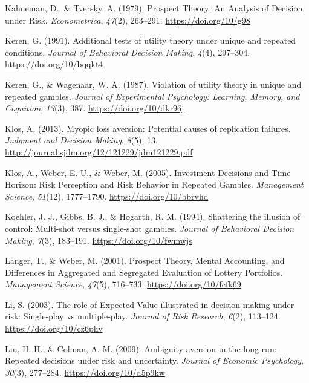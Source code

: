 \documentclass[
  english,
  man, donotrepeattitle,floatsintext]{apa7}
\newlength{\cslhangindent}
\newenvironment{cslreferences}%
  {\setlength{\parindent}{0pt}%
  \everypar{\setlength{\hangindent}{\cslhangindent}}\ignorespaces}%
  {\par}
\theoremstyle{definition}
\theoremstyle{definition}
\theoremstyle{definition}
\theoremstyle{definition}
\theoremstyle{remark}
\begin{document}
\begin{cslreferences}
\leavevmode\hypertarget{ref-kahneman1979}{}%
Kahneman, D., \& Tversky, A. (1979). Prospect Theory: An Analysis of Decision under Risk. \emph{Econometrica}, \emph{47}(2), 263--291. \url{https://doi.org/10/g98}

\leavevmode\hypertarget{ref-keren1991}{}%
Keren, G. (1991). Additional tests of utility theory under unique and repeated conditions. \emph{Journal of Behavioral Decision Making}, \emph{4}(4), 297--304. \url{https://doi.org/10/bqqkt4}

\leavevmode\hypertarget{ref-keren1987}{}%
Keren, G., \& Wagenaar, W. A. (1987). Violation of utility theory in unique and repeated gambles. \emph{Journal of Experimental Psychology: Learning, Memory, and Cognition}, \emph{13}(3), 387. \url{https://doi.org/10/dkr96j}

\leavevmode\hypertarget{ref-klos2013}{}%
Klos, A. (2013). Myopic loss aversion: Potential causes of replication failures. \emph{Judgment and Decision Making}, \emph{8}(5), 13. \url{http://journal.sjdm.org/12/121229/jdm121229.pdf}

\leavevmode\hypertarget{ref-klos2005}{}%
Klos, A., Weber, E. U., \& Weber, M. (2005). Investment Decisions and Time Horizon: Risk Perception and Risk Behavior in Repeated Gambles. \emph{Management Science}, \emph{51}(12), 1777--1790. \url{https://doi.org/10/bbrvhd}

\leavevmode\hypertarget{ref-koehler1994}{}%
Koehler, J. J., Gibbs, B. J., \& Hogarth, R. M. (1994). Shattering the illusion of control: Multi-shot versus single-shot gambles. \emph{Journal of Behavioral Decision Making}, \emph{7}(3), 183--191. \url{https://doi.org/10/fwmwjs}

\leavevmode\hypertarget{ref-langer2001}{}%
Langer, T., \& Weber, M. (2001). Prospect Theory, Mental Accounting, and Differences in Aggregated and Segregated Evaluation of Lottery Portfolios. \emph{Management Science}, \emph{47}(5), 716--733. \url{https://doi.org/10/fcfk69}

\leavevmode\hypertarget{ref-li2003}{}%
Li, S. (2003). The role of Expected Value illustrated in decision-making under risk: Single-play vs multiple-play. \emph{Journal of Risk Research}, \emph{6}(2), 113--124. \url{https://doi.org/10/cz6phv}

\leavevmode\hypertarget{ref-liu2009}{}%
Liu, H.-H., \& Colman, A. M. (2009). Ambiguity aversion in the long run: Repeated decisions under risk and uncertainty. \emph{Journal of Economic Psychology}, \emph{30}(3), 277--284. \url{https://doi.org/10/d5p9kw}


\end{cslreferences}
\end{document}
